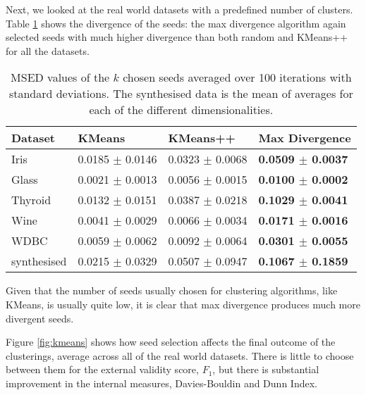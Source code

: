 Next, we looked at the real world datasets with a predefined number of clusters.  Table \ref{tab:cluster_validation} shows the divergence of the seeds: the max divergence algorithm again selected seeds with much higher divergence than both random and KMeans++ for all the datasets.
\begin{table}
\caption{
MSED values of the $k$ chosen seeds averaged over 100 iterations with standard deviations.  The synthesised data is the mean of averages for each of the different dimensionalities.
}\label{tab:cluster_validation}
\begin{tabularx}{\textwidth}{Xl|l|l}
\hline
Dataset			&KMeans						&KMeans++					& Max Divergence\\ 
\hline
Iris				&0.0185	$\pm$ 0.0146	&0.0323 	$\pm$ 0.0068		&\textbf{0.0509 $\pm$ 0.0037}\\
Glass			&0.0021	$\pm$ 0.0013	&0.0056	$\pm$ 0.0015		&\textbf{0.0100 $\pm$ 0.0002}\\
Thyroid			&0.0132	$\pm$ 0.0151	&0.0387	$\pm$ 0.0218		&\textbf{0.1029 $\pm$ 0.0041}\\
Wine				&0.0041	$\pm$ 0.0029	&0.0066	$\pm$ 0.0034		&\textbf{0.0171 $\pm$ 0.0016}\\
WDBC				&0.0059	$\pm$ 0.0062	&0.0092	$\pm$ 0.0064		&\textbf{0.0301 $\pm$ 0.0055}\\
\hline
synthesised		&0.0215 $\pm$ 0.0329	&0.0507 $\pm$ 0.0947		&\textbf{0.1067 $\pm$ 0.1859}\\
\hline
\end{tabularx}
\end{table}

Given that the number of seeds usually chosen for clustering algorithms, like KMeans, is usually quite low, it is clear that max divergence produces much more divergent seeds.

Figure \ref{fig:kmeans} shows how seed selection affects the final outcome of the clusterings, average across all of the real world datasets. There is little to choose between them for the external validity score, $F_1$, but there is substantial improvement in the internal measures, Davies-Bouldin and Dunn Index.   

